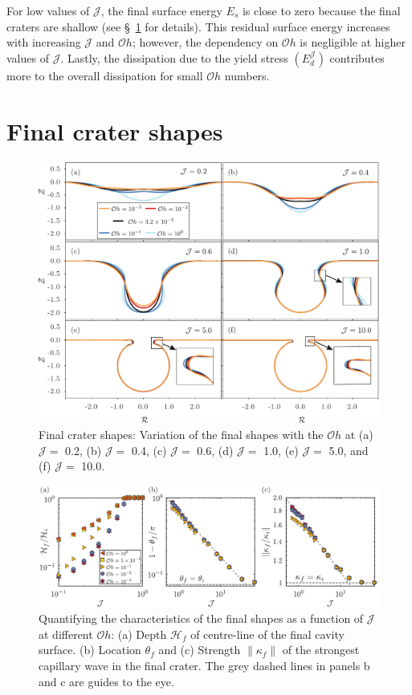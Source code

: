 \documentclass[final]{jfm}
\begin{document}
For low values of $\mathcal{J}$, the final surface energy $E_s$ is close to zero because the final craters are shallow (see \S~\ref{Sec::EquilibriumStates} for details). This residual surface energy increases with increasing $\mathcal{J}$ and $\mathcal{O}h$; however, the dependency on $\mathcal{O}h$ is negligible at higher values of $\mathcal{J}$. Lastly, the dissipation due to the yield stress $\left(E_d^\mathcal{J}\right)$ contributes more to the overall dissipation for small $\mathcal{O}h$ numbers.

\section{Final crater shapes}\label{Sec::EquilibriumStates}
 \begin{figure}
	\centerline{\includegraphics[width=\linewidth]{Figure6_FinalShapes-eps-converted-to.pdf}}%
	\caption{Final crater shapes: Variation of the final shapes with the $\mathcal{O}h$ at (a) $\mathcal{J} =$ 0.2, (b) $\mathcal{J} =$ 0.4, (c) $\mathcal{J} =$ 0.6, (d) $\mathcal{J} =$ 1.0, (e) $\mathcal{J} =$ 5.0, and (f) $\mathcal{J} =$ 10.0.}
	\label{fig:Zoo_of_Final_Shapes}
\end{figure}
\begin{figure}
	\centerline{\includegraphics[width=\linewidth]{Figure7_FrozenState_Quantify-eps-converted-to.pdf}}%
	\caption{Quantifying the characteristics of the final shapes as a function of $\mathcal{J}$ at different $\mathcal{O}h$: (a) Depth $\mathcal{H}_f$ of centre-line of the final cavity surface. (b) Location $\theta_f$ and (c) Strength $\|\kappa_f\|$ of the strongest capillary wave in the final crater. The grey dashed lines in panels b and c are guides to the eye.}
	\label{fig:Quantification_Final_Shapes}
\end{figure}
\end{document}
